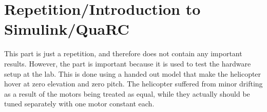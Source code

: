 \section{Repetition/Introduction to Simulink/QuaRC}\label{sec:prob1}

This part is just a repetition, and therefore does not contain any important results. However, the part is important because it is used to test the hardware setup at the lab. This is done using a handed out model that make the helicopter hover at zero elevation and zero pitch. The helicopter suffered from minor drifting as a result of the motors being treated as equal, while they actually should be tuned separately with one motor constant each. 